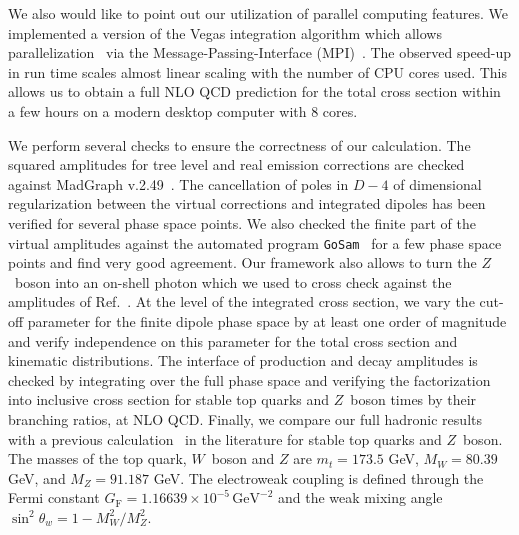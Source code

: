 \documentclass[preprint]{JHEP3}
\newcommand{\GeV}{\mathrm{GeV}}
\begin{document}
We also would like to point out our utilization of parallel computing features. 
We implemented a version of the Vegas integration algorithm which allows parallelization~\cite{pvegas} via the Message-Passing-Interface (MPI)~\cite{mpi-2-standard}. 
The observed speed-up in run time scales almost linear scaling with the number of CPU cores used. 
This allows us to obtain a full NLO QCD prediction for the total cross section within a few hours on a modern desktop computer with 8 cores.

We perform several checks to ensure the correctness of our calculation. 
The squared amplitudes for tree level and real emission corrections are checked against MadGraph v.2.49~\cite{Stelzer:1994ta}. 
The cancellation of poles in $D-4$ of dimensional regularization between the virtual corrections and integrated dipoles has been verified for several phase space points.
We also checked the finite part of the virtual amplitudes against the automated program {\tt GoSam}~\cite{Cullen:2011ac} for a few phase space points and find
very good agreement. 
Our framework also allows to turn the $Z$~boson into an on-shell photon which we used to cross check against the amplitudes of Ref.~\cite{Melnikov:2011ta}. 
At the level of the integrated cross section, we vary the cut-off parameter for the finite dipole phase space by at least one order of magnitude and 
verify independence on this parameter for the total cross section and kinematic distributions.
The interface of production and decay amplitudes is checked by integrating over the full phase space and verifying the factorization into 
inclusive cross section for stable top quarks and $Z$~boson times by their branching ratios, at NLO QCD.
% 
Finally, we compare our full hadronic results with a previous calculation~\cite{Garzelli:2012bn} in the literature for stable top quarks and $Z$~boson.
The masses of the top quark, $W$~boson and $Z$ are $m_t=173.5$ GeV, $M_W=80.39$ GeV, and $M_Z=91.187$ GeV. 
The electroweak coupling is defined through the Fermi constant $G_\mathrm{F}=1.16639 \times 10^{-5} \, \GeV^{-2}$ and the weak mixing angle $\sin^2\theta_w = 1-M_W^2/M_Z^2$. 
\end{document}
